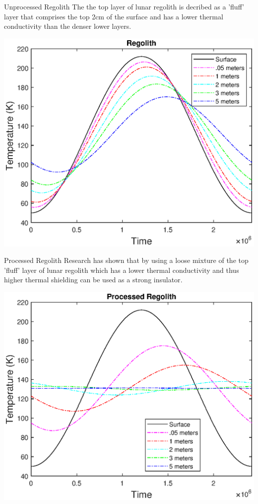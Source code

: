 \documentclass{beamer}
\begin{document}
\begin{frame}{Unprocessed Regolith}
The the top layer of lunar regolith is decribed as a 'fluff' layer that comprises the top 2cm of the surface and has a lower thermal conductivity than the denser lower layers\cite{Malla}.
 \begin{center}
             \includegraphics[width= .75\textwidth]{Regolith_Pulse.eps}   
      \end{center}  
\end{frame}


\begin{frame}{Processed Regolith}
Research has shown that by using a loose mixture of the top 'fluff' layer of lunar regolith  which has a lower thermal conductivity and thus higher thermal shielding can be used as a strong insulator\cite{Malla}.
 \begin{center}
             \includegraphics[width= .75\textwidth]{Processed_Regolith.eps}   
      \end{center}  
\end{frame}
\end{document}

